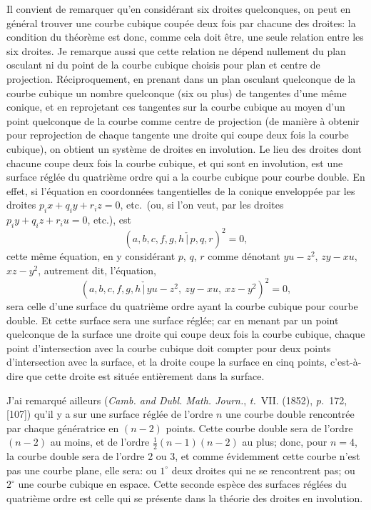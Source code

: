 \documentclass[11pt,a4paper]{article}
\newcommand{\tome}{\textit{t.}}
\newcommand{\page}{\textit{p.}}
\newcommand{\bcheck}{\,\check{\!|\,}}
\begin{document}
Il convient de remarquer qu'en consid\'{e}rant six droites quelconques, on peut en g\'{e}n\'{e}ral trouver une courbe cubique coup\'{e}e deux fois par chacune des droites: la condition du th\'{e}or\`{e}me est donc, comme cela doit \^{e}tre, une seule relation entre les six droites. Je remarque aussi que cette relation ne d\'{e}pend nullement du plan osculant ni du point de la courbe cubique choisis pour plan et centre de projection. R\'{e}ciproquement, en prenant dans un plan osculant quelconque de la courbe cubique un nombre quelconque (six ou plus) de tangentes d'une m\^{e}me conique, et en reprojetant ces tangentes sur la courbe cubique au moyen d'un point quelconque de la courbe comme centre de projection (de mani\`{e}re \`{a} obtenir pour reprojection de chaque tangente une droite qui coupe deux fois la courbe cubique), on obtient un syst\`{e}me de droites en involution. Le lieu des droites dont chacune coupe deux fois la courbe cubique, et qui sont en involution, est une surface r\'{e}gl\'{e}e du quatri\`{e}me ordre qui a la courbe cubique pour courbe double. En effet, si l'\'{e}quation en coordonn\'{e}es tangentielles de la conique envelopp\'{e}e par les droites $p_i x + q_i y + r_i z = 0$, etc.\ (ou, si l'on veut, par les droites $p_i y + q_i z + r_i u = 0$, etc.), est
\[
(a, b, c, f, g, h \bcheck p, q, r)^2 = 0,
\]
cette m\^{e}me \'{e}quation, en y consid\'{e}rant $p$, $q$, $r$ comme d\'{e}notant $yu - z^2$, $zy - xu$, $xz - y^2$, autrement dit, l'\'{e}quation,
\[
(a, b, c, f, g, h \bcheck yu - z^2,\ zy - xu,\ xz - y^2)^2 = 0,
\]
sera celle d'une surface du quatri\`{e}me ordre ayant la courbe cubique pour courbe double. Et cette surface sera une surface r\'{e}gl\'{e}e; car en menant par un point quelconque de la surface une droite qui coupe deux fois la courbe cubique, chaque point d'intersection avec la courbe cubique doit compter pour deux points d'intersection avec la surface, et la droite coupe la surface en cinq points, c'est-\`{a}-dire que cette droite est situ\'{e}e enti\`{e}rement dans la surface.

J'ai remarqu\'{e} ailleurs (\textit{Camb. and Dubl. Math. Journ.}, \tome~VII. (1852), \page~172, [107]) qu'il y a sur une surface r\'{e}gl\'{e}e de l'ordre $n$ une courbe double rencontr\'{e}e par chaque g\'{e}n\'{e}ratrice en $(n-2)$ points. Cette courbe double sera de l'ordre $(n-2)$ au moins, et de l'ordre $\tfrac{1}{2}(n-1)(n-2)$ au plus; donc, pour $n = 4$, la courbe double sera de l'ordre 2 ou 3, et comme \'{e}videmment cette courbe n'est pas une courbe plane, elle sera: ou $1^\circ$ deux droites qui ne se rencontrent pas; ou $2^\circ$ une courbe cubique en espace. Cette seconde esp\`{e}ce des surfaces r\'{e}gl\'{e}es du quatri\`{e}me ordre est celle qui se pr\'{e}sente dans la th\'{e}orie des droites en involution.
\end{document}
